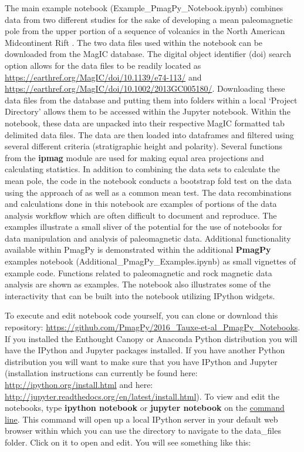 \documentclass[11pt]{book}
\begin{document}
{{{The main example notebook (Example\_PmagPy\_Notebook.ipynb) combines data from two different studies for the sake of developing a mean paleomagnetic pole from the upper portion of a sequence of volcanics in the North American Midcontinent Rift \citep{halls74, swansonhysell14}.  The two data files used within the notebook can be downloaded from the MagIC database. The digital object identifier (doi) search option allows for the data files to be readily located as  \url{https://earthref.org/MagIC/doi/10.1139/e74-113/} and \url{https://earthref.org/MagIC/doi/10.1002/2013GC005180/}. Downloading these data files from the database and putting them into folders within a local `Project Directory' allows them to be accessed within the Jupyter notebook. Within the notebook, these data are unpacked into their respective MagIC formatted tab delimited data files. The data are then loaded into dataframes and filtered using several different criteria (stratigraphic height and polarity).  Several functions from the {\bf ipmag} module are used for making equal area projections and calculating statistics. In addition to combining the data sets to calculate the mean pole, the code in the notebook conducts a bootstrap fold test on the data using the approach of \cite{tauxe94} as well as a common mean test. The data recombinations and calculations done in this notebook are examples of portions of the data analysis workflow which are often difficult to document and reproduce. The examples illustrate a small sliver of the potential for the use of notebooks for data manipulation and analysis of paleomagnetic data. Additional functionality available within PmagPy is demonstrated within the additional {\bf PmagPy} examples notebook (Additional\_PmagPy\_Examples.ipynb) as small vignettes of example code. Functions related to paleomagnetic and rock magnetic data analysis are shown as examples. The notebook also illustrates some of the interactivity that can be built into the notebook utilizing IPython widgets.

To execute and edit notebook code yourself, you can clone or download this repository: \url{https://github.com/PmagPy/2016_Tauxe-et-al_PmagPy_Notebooks}.  If you installed the Enthought Canopy or Anaconda Python distribution you will have the IPython and Jupyter packages installed. If you have another Python distribution you will want to make sure that you have IPython and Jupyter (installation instructions can currently be found here: \url{http://ipython.org/install.html} and here: \url{http://jupyter.readthedocs.org/en/latest/install.html}). To view and edit the notebooks,  type {\bf ipython notebook} or {\bf jupyter notebook} on the \href{#command_line}{command line}.  This command will open up a local IPython server in your default web browser within which you can use the directory to navigate to the data\_files folder. Click on it to open and edit. You will see something like this:

}}}
\end{document}
